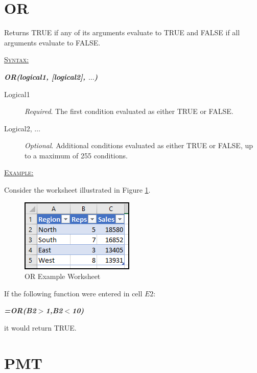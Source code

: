 \section{OR}

Returns TRUE if any of its arguments evaluate to TRUE and FALSE if all arguments evaluate to FALSE.

\begin{addmargin}[1cm]{0cm}
	
	\medskip
	\underline{\textsc{Syntax:}}
	\medskip
	
	{\color{Syntax}
		\noindent\textit{\textbf{OR(logical1, [logical2], $\ldots$)}}
	}
	
	\begin{description}
		\item[Logical1] \textit{Required}. The first condition evaluated as either TRUE or FALSE.
		\item[Logical2, $\ldots$] \textit{Optional}. Additional conditions evaluated as either TRUE or FALSE, up to a maximum of 255 conditions.
	\end{description}

	\medskip
	\noindent\underline{\textsc{Example:}}
	\medskip
	
	\noindent Consider the worksheet illustrated in Figure \ref{apa:or}.
	
	\begin{figure}[H]
		\centering
		\includegraphics[width=\maxwidth{.45\linewidth}]{gfx/apa_fig01}
		\caption{OR Example Worksheet}
		\label{apa:or}
	\end{figure}
	
	\noindent If the following function were entered in cell $ E2 $:
	
	{\color{Syntax}
		\textit{\textbf{=OR(B2$>$1,B2$<$10)}}
	}
	
	\noindent it would return TRUE.

\end{addmargin}

\section{PMT}

